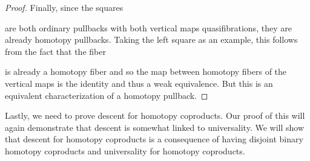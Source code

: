 \begin{prop}
\begin{proof}
        Finally, since the squares 
        \begin{center}
        \end{center}
        are both ordinary pullbacks %
        with both vertical maps quasifibrations, they are already homotopy pullbacks. %
        Taking the left square as an example, this follows from the fact that the fiber
        \begin{center}
        \end{center}
        is already a homotopy fiber and so the map between homotopy fibers of the vertical maps is the identity and thus a weak equivalence.
        But this is an equivalent characterization of a homotopy pullback. %
    \end{proof}
\end{prop}
Lastly, we need to prove descent for homotopy coproducts. 
Our proof of this will again demonstrate that descent is somewhat linked to universality.
We will show that descent for homotopy coproducts is a consequence of having disjoint binary homotopy coproducts and universality for homotopy coproducts.

